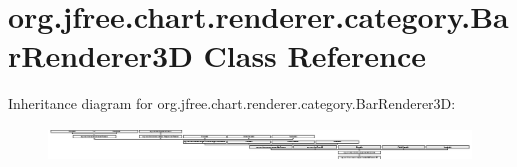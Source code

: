 \hypertarget{classorg_1_1jfree_1_1chart_1_1renderer_1_1category_1_1_bar_renderer3_d}{}\section{org.\+jfree.\+chart.\+renderer.\+category.\+Bar\+Renderer3D Class Reference}
\label{classorg_1_1jfree_1_1chart_1_1renderer_1_1category_1_1_bar_renderer3_d}
Inheritance diagram for org.\+jfree.\+chart.\+renderer.\+category.\+Bar\+Renderer3D\+:\begin{figure}[H]
\begin{center}
\leavevmode
\includegraphics[height=0.865979cm]{classorg_1_1jfree_1_1chart_1_1renderer_1_1category_1_1_bar_renderer3_d}
\end{center}
\end{figure}
